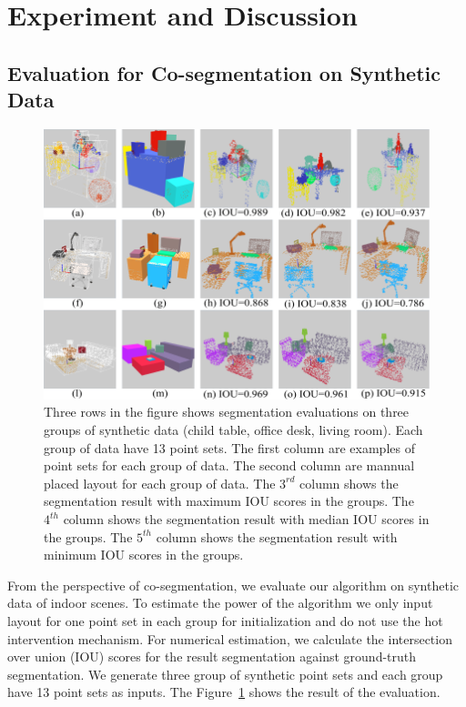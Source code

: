 \section{Experiment and Discussion}
\subsection{Evaluation for Co-segmentation on Synthetic Data}
\begin{figure}[htb]
	\centering
	\includegraphics[width=0.8\linewidth]{images/seg/seg}
	\caption{\label{fig:seg}Three rows in the figure shows segmentation evaluations on three groups of synthetic data (child table, office desk, living room). Each group of data have 13 point sets. The first column are examples of point sets for each group of data. The second column are mannual placed layout for each group of data. The $3^{rd}$ column shows the segmentation result with maximum IOU scores in the groups. The $4^{th}$ column shows the segmentation result with median IOU scores in the groups. The $5^{th}$ column shows the segmentation result with minimum IOU scores in the groups.}
\end{figure}
From the perspective of co-segmentation, we evaluate our algorithm on synthetic data of indoor scenes. To estimate the power of the algorithm we only input layout for one point set in each group for initialization and do not use the hot intervention mechanism. For numerical estimation, we calculate the intersection over union (IOU) scores for the result segmentation against ground-truth segmentation. We generate three group of synthetic point sets and each group have 13 point sets as inputs. The Figure~\ref{fig:seg} shows the result of the evaluation.



